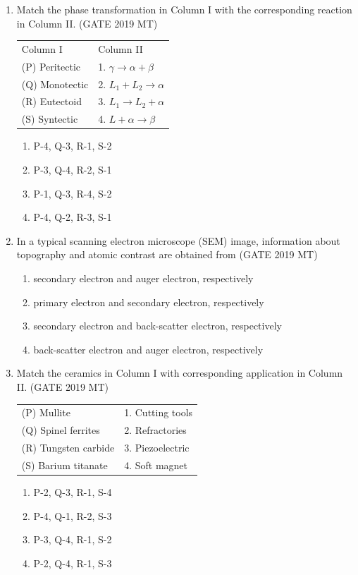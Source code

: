 \documentclass[12pt]{article}
\begin{document}
\begin{enumerate}
\item Match the phase transformation in Column I with the corresponding reaction in Column II. (GATE 2019 MT)
\begin{center}
\begin{tabular}{ll}
Column I             & Column II              \\
(P) Peritectic        & 1. $\gamma \to \alpha + \beta$ \\
(Q) Monotectic        & 2. $L_1 + L_2 \to \alpha$ \\
(R) Eutectoid         & 3. $L_1 \to L_2 + \alpha$ \\
(S) Syntectic         & 4. $L + \alpha \to \beta$ \\
\end{tabular}
\end{center}
\begin{enumerate}[label=(\alph*)]
    \item P-4, Q-3, R-1, S-2
    \item P-3, Q-4, R-2, S-1
    \item P-1, Q-3, R-4, S-2
    \item P-4, Q-2, R-3, S-1
\end{enumerate}

\item In a typical scanning electron microscope (SEM) image, information about topography and atomic contrast are obtained from (GATE 2019 MT)
\begin{enumerate}[label=(\alph*)]
    \item secondary electron and auger electron, respectively
    \item primary electron and secondary electron, respectively
    \item secondary electron and back-scatter electron, respectively
    \item back-scatter electron and auger electron, respectively
\end{enumerate}

\item Match the ceramics in Column I with corresponding application in Column II. (GATE 2019 MT)
\begin{center}
\begin{tabular}{ll}
(P) Mullite          & 1. Cutting tools \\
(Q) Spinel ferrites  & 2. Refractories \\
(R) Tungsten carbide & 3. Piezoelectric \\
(S) Barium titanate  & 4. Soft magnet \\
\end{tabular}
\end{center}
\begin{enumerate}[label=(\alph*)]
    \item P-2, Q-3, R-1, S-4
    \item P-4, Q-1, R-2, S-3
    \item P-3, Q-4, R-1, S-2
    \item P-2, Q-4, R-1, S-3
\end{enumerate}


\end{enumerate}
\end{document}
